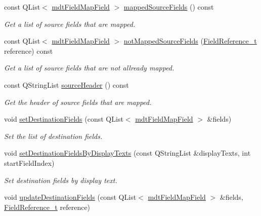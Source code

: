 \begin{DoxyCompactItemize}
const Q\-List$<$ \hyperlink{classmdt_field_map_field}{mdt\-Field\-Map\-Field} $>$ \hyperlink{classmdt_field_map_a289b3eddb87f74e61935e92ed77ff065}{mapped\-Source\-Fields} () const 
\begin{DoxyCompactList}\small\item\em Get a list of source fields that are mapped. \end{DoxyCompactList}\item 
const Q\-List$<$ \hyperlink{classmdt_field_map_field}{mdt\-Field\-Map\-Field} $>$ \hyperlink{classmdt_field_map_a32c026ccb54a4b783b77963bcbfd9212}{not\-Mapped\-Source\-Fields} (\hyperlink{classmdt_field_map_a8a8dd62273d396d926bf3df837407392}{Field\-Reference\-\_\-t} reference) const 
\begin{DoxyCompactList}\small\item\em Get a list of source fields that are not allready mapped. \end{DoxyCompactList}\item 
const Q\-String\-List \hyperlink{classmdt_field_map_a90eaf7b7d88fdbc5a9aed699973dc8c3}{source\-Header} () const 
\begin{DoxyCompactList}\small\item\em Get the header of source fields that are mapped. \end{DoxyCompactList}\item 
void \hyperlink{classmdt_field_map_ade135ff5cb703c0d07e628773a537008}{set\-Destination\-Fields} (const Q\-List$<$ \hyperlink{classmdt_field_map_field}{mdt\-Field\-Map\-Field} $>$ \&fields)
\begin{DoxyCompactList}\small\item\em Set the list of destination fields. \end{DoxyCompactList}\item 
void \hyperlink{classmdt_field_map_a056668f338ddb31af849922a1f27aeec}{set\-Destination\-Fields\-By\-Display\-Texts} (const Q\-String\-List \&display\-Texts, int start\-Field\-Index)
\begin{DoxyCompactList}\small\item\em Set destination fields by display text. \end{DoxyCompactList}\item 
void \hyperlink{classmdt_field_map_a2f0f2c1958b328d83d166ebd95bfca3b}{update\-Destination\-Fields} (const Q\-List$<$ \hyperlink{classmdt_field_map_field}{mdt\-Field\-Map\-Field} $>$ \&fields, \hyperlink{classmdt_field_map_a8a8dd62273d396d926bf3df837407392}{Field\-Reference\-\_\-t} reference)

\end{DoxyCompactItemize}

